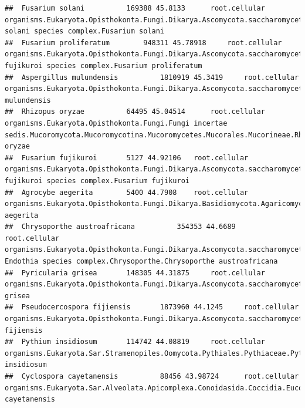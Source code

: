 \documentclass{article}\usepackage[]{graphicx}\usepackage[]{color}
\makeatletter
\newenvironment{kframe}{%
 \def\at@end@of@kframe{}%
 \ifinner\ifhmode%
  \def\at@end@of@kframe{\end{minipage}}%
  \begin{minipage}{\columnwidth}%
 \fi\fi%
 \def\FrameCommand##1{\hskip\@totalleftmargin \hskip-\fboxsep
 \colorbox{shadecolor}{##1}\hskip-\fboxsep
     \hskip-\linewidth \hskip-\@totalleftmargin \hskip\columnwidth}%
 \MakeFramed {\advance\hsize-\width
   \@totalleftmargin\z@ \linewidth\hsize
   \@setminipage}}%
 {\par\unskip\endMakeFramed%
 \at@end@of@kframe}
\newenvironment{knitrout}{}{} %
\makeatother
\begin{document}
\begin{knitrout}
\begin{kframe}
\begin{verbatim}
##  Fusarium solani 		 169388 45.8133 	 root.cellular organisms.Eukaryota.Opisthokonta.Fungi.Dikarya.Ascomycota.saccharomyceta.Pezizomycotina.leotiomyceta.sordariomyceta.Sordariomycetes.Hypocreomycetidae.Hypocreales.Nectriaceae.Fusarium.Fusarium solani species complex.Fusarium solani
##  Fusarium proliferatum 		 948311 45.78918 	 root.cellular organisms.Eukaryota.Opisthokonta.Fungi.Dikarya.Ascomycota.saccharomyceta.Pezizomycotina.leotiomyceta.sordariomyceta.Sordariomycetes.Hypocreomycetidae.Hypocreales.Nectriaceae.Fusarium.Fusarium fujikuroi species complex.Fusarium proliferatum
##  Aspergillus mulundensis 		 1810919 45.3419 	 root.cellular organisms.Eukaryota.Opisthokonta.Fungi.Dikarya.Ascomycota.saccharomyceta.Pezizomycotina.leotiomyceta.Eurotiomycetes.Eurotiomycetidae.Eurotiales.Aspergillaceae.Aspergillus.Aspergillus mulundensis
##  Rhizopus oryzae 		 64495 45.04514 	 root.cellular organisms.Eukaryota.Opisthokonta.Fungi.Fungi incertae sedis.Mucoromycota.Mucoromycotina.Mucoromycetes.Mucorales.Mucorineae.Rhizopodaceae.Rhizopus.Rhizopus oryzae
##  Fusarium fujikuroi 		 5127 44.92106 	 root.cellular organisms.Eukaryota.Opisthokonta.Fungi.Dikarya.Ascomycota.saccharomyceta.Pezizomycotina.leotiomyceta.sordariomyceta.Sordariomycetes.Hypocreomycetidae.Hypocreales.Nectriaceae.Fusarium.Fusarium fujikuroi species complex.Fusarium fujikuroi
##  Agrocybe aegerita 		 5400 44.7908 	 root.cellular organisms.Eukaryota.Opisthokonta.Fungi.Dikarya.Basidiomycota.Agaricomycotina.Agaricomycetes.Agaricomycetidae.Agaricales.Bolbitiaceae.Agrocybe.Agrocybe aegerita
##  Chrysoporthe austroafricana 		 354353 44.6689 	 root.cellular organisms.Eukaryota.Opisthokonta.Fungi.Dikarya.Ascomycota.saccharomyceta.Pezizomycotina.leotiomyceta.sordariomyceta.Sordariomycetes.Sordariomycetidae.Diaporthales.Cryphonectriaceae.Cryphonectria-Endothia species complex.Chrysoporthe.Chrysoporthe austroafricana
##  Pyricularia grisea 		 148305 44.31875 	 root.cellular organisms.Eukaryota.Opisthokonta.Fungi.Dikarya.Ascomycota.saccharomyceta.Pezizomycotina.leotiomyceta.sordariomyceta.Sordariomycetes.Sordariomycetidae.NA.Pyriculariaceae.Pyricularia.Pyricularia grisea
##  Pseudocercospora fijiensis 		 1873960 44.1245 	 root.cellular organisms.Eukaryota.Opisthokonta.Fungi.Dikarya.Ascomycota.saccharomyceta.Pezizomycotina.leotiomyceta.dothideomyceta.Dothideomycetes.Dothideomycetidae.Capnodiales.Mycosphaerellaceae.Pseudocercospora.Pseudocercospora fijiensis
##  Pythium insidiosum 		 114742 44.08819 	 root.cellular organisms.Eukaryota.Sar.Stramenopiles.Oomycota.Pythiales.Pythiaceae.Pythium.Pythium insidiosum
##  Cyclospora cayetanensis 		 88456 43.98724 	 root.cellular organisms.Eukaryota.Sar.Alveolata.Apicomplexa.Conoidasida.Coccidia.Eucoccidiorida.Eimeriorina.Eimeriidae.Cyclospora.Cyclospora cayetanensis

\end{verbatim}
\end{kframe}
\end{knitrout}
\end{document}
